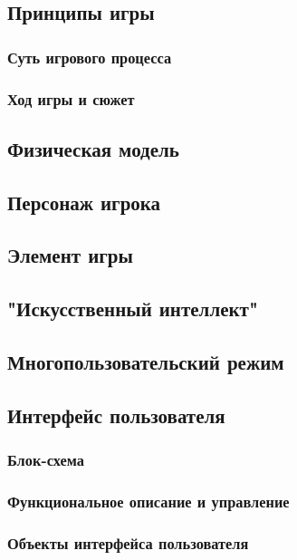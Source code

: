 \documentclass{article}
\begin{document}
\subsection{Принципы игры}

\subsubsection{Суть игрового процесса}
\subsubsection{Ход игры и сюжет}

\subsection{Физическая модель}

\subsection{Персонаж игрока}

\subsection{Элемент игры}

\subsection{"Искусственный интеллект"}

\subsection{Многопользовательский режим}

\subsection{Интерфейс пользователя}

\subsubsection{Блок-схема}
\subsubsection{Функциональное описание и управление}
\subsubsection{Объекты интерфейса пользователя}
\end{document}

